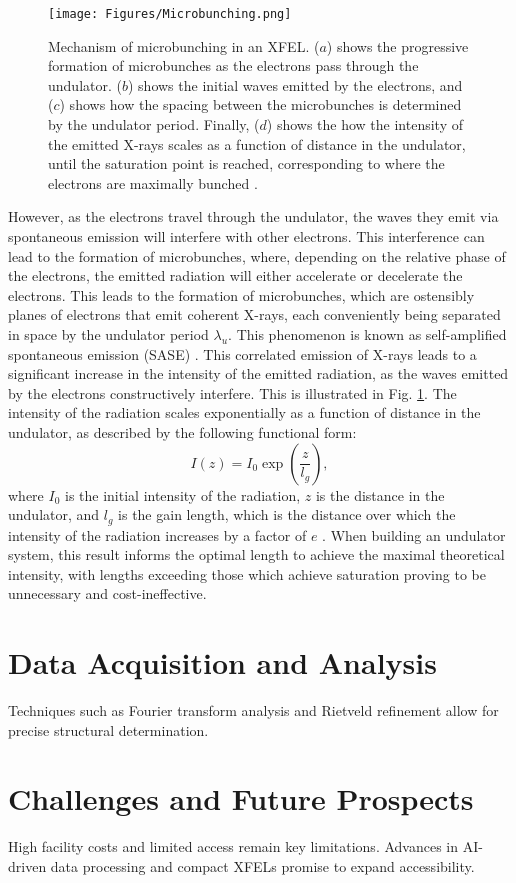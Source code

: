 \documentclass[aps,prb,twocolumn,superscriptaddress]{revtex4-2}
\begin{document}
\begin{figure}[h]
    \centering
    \texttt{[image: Figures/Microbunching.png]}
    \caption{Mechanism of microbunching in an XFEL. ($a$) shows the progressive
        formation of microbunches as the electrons pass through the undulator.
        ($b$) shows the initial waves emitted by the electrons, and ($c$) shows
        how the spacing between the microbunches is determined by the undulator
        period. Finally, ($d$) shows the how the intensity of the emitted X-rays
        scales as a function of distance in the undulator, until the saturation
        point is reached, corresponding to where the electrons are maximally 
        bunched \cite{EMMA}.}
    \label{fig:Undulator}
\end{figure}
However, as the electrons travel through the
undulator, the waves they emit via spontaneous emission will interfere with 
other electrons. This interference can lead to the formation of microbunches,
where, depending on the relative phase of the electrons, the emitted radiation
will either accelerate or decelerate the electrons. This leads to the formation
of microbunches, which are ostensibly planes of electrons that emit coherent
X-rays, each conveniently being separated in space by the undulator period
$\lambda_u$. This phenomenon is known as self-amplified spontaneous emission 
(SASE) \cite{Saldin2006}.
This correlated emission of X-rays leads to a significant increase in the intensity
of the emitted radiation, as the waves emitted by the electrons constructively
interfere. This is illustrated in Fig. \ref{fig:Undulator}. The intensity of the
radiation scales exponentially as a function of distance in the undulator, as described 
by the following functional form:
\begin{equation}
    I(z) = I_0\exp\left(\frac{z}{l_g}\right),
\end{equation}
where $I_0$ is the initial intensity of the radiation, $z$ is the distance in the
undulator, and $l_g$ is the gain length, which is the distance over which the
intensity of the radiation increases by a factor of $e$ \cite{Bonifacio}. When 
building an undulator system, this result informs the optimal length to achieve 
the maximal theoretical intensity, with lengths exceeding those which achieve saturation 
proving to be unnecessary and cost-ineffective.
\newpage






\section{Data Acquisition and Analysis} \label{sec:data}
Techniques such as Fourier transform analysis and Rietveld refinement allow for precise structural determination.

\section{Challenges and Future Prospects} \label{sec:challenges}
High facility costs and limited access remain key limitations. Advances in AI-driven data processing and compact XFELs
promise to expand accessibility.



\end{document}
